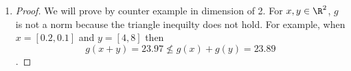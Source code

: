 \documentclass[shortlabels]{article}
\begin{document}
\begin{aprob}
\begin{enumerate}
\begin{proof}
            (iii)
            For all $x,y \in \R^n$, we will show that $ f(x + y)  \leq  f(x)  + f(y) $.
            \[  f(x)  +  f(y)  =  \sum_{i=1}^n |x_i|  +  \sum_{i=1}^n |y_i|  \]
            By linearity and because the norm is the absolute value for $x_i \in \R$, 
            \[  = \sum^n_{i=1} \left( |x_i| + |y_i| \right) \] 
            where for each $i$, the triangle inequality holds for $x_i, y_i \in \R$.
            \[ |x_i| + |y_i| \geq | x_i + y_i | \]
            Then,
            $$ \sum^n_{i=1} \left( |x_i| + |y_i| \right) \geq  \sum^n_{i=1} \left( |x_i + y_i | \right) $$
            where 
            $$ \sum^n_{i=1} \left( |x_i + y_i | \right) =  f(x  +  y) $$
            Thus, $  f(x+y) \leq f(x) + f(y) $,  the triangle inequality holds for $f(x)$ as shown.
        \end{proof}
        \newpage
        \item \begin{proof}
            We will prove by counter example in dimension of 2. For $x,y \in \R^2$, $g$ is not a norm because the triangle inequilty does not hold. 
            For example, when $x = [ 0.2, 0.1 ]$ and $y = [ 4,8]$ then $$g(x+y) = 23.97 \nleq g(x) + g(y) = 23.89$$.
        \end{proof}
    \end{enumerate}
\end{aprob}

\newpage
\end{document}
